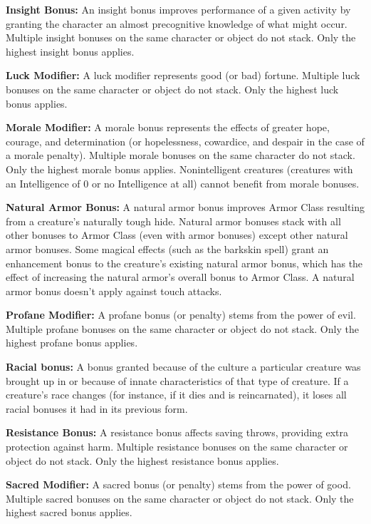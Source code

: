 \textbf{Insight Bonus:} An insight bonus improves performance of a given activity by granting the character an almost precognitive knowledge of what might occur. Multiple insight bonuses on the same character or object do not stack. Only the highest insight bonus applies.

\textbf{Luck Modifier:} A luck modifier represents good (or bad) fortune. Multiple luck bonuses on the same character or object do not stack. Only the highest luck bonus applies.

\textbf{Morale Modifier:} A morale bonus represents the effects of greater hope, courage, and determination (or hopelessness, cowardice, and despair in the case of a morale penalty). Multiple morale bonuses on the same character do not stack. Only the highest morale bonus applies. Nonintelligent creatures (creatures with an Intelligence of 0 or no Intelligence at all) cannot benefit from morale bonuses.

\textbf{Natural Armor Bonus:} A natural armor bonus improves Armor Class resulting from a creature's naturally tough hide. Natural armor bonuses stack with all other bonuses to Armor Class (even with armor bonuses) except other natural armor bonuses. Some magical effects (such as the barkskin spell) grant an enhancement bonus to the creature's existing natural armor bonus, which has the effect of increasing the natural armor's overall bonus to Armor Class. A natural armor bonus doesn't apply against touch attacks.

\textbf{Profane Modifier:} A profane bonus (or penalty) stems from the power of evil. Multiple profane bonuses on the same character or object do not stack. Only the highest profane bonus applies.

\textbf{Racial bonus:} A bonus granted because of the culture a particular creature was brought up in or because of innate characteristics of that type of creature. If a creature's race changes (for instance, if it dies and is reincarnated), it loses all racial bonuses it had in its previous form.

\textbf{Resistance Bonus:} A resistance bonus affects saving throws, providing extra protection against harm. Multiple resistance bonuses on the same character or object do not stack. Only the highest resistance bonus applies.

\textbf{Sacred Modifier:} A sacred bonus (or penalty) stems from the power of good. Multiple sacred bonuses on the same character or object do not stack. Only the highest sacred bonus applies.

